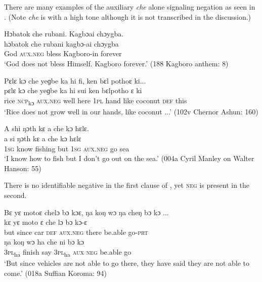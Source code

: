 There are many examples of the auxiliary \textit{che} alone signaling negation as seen in . (Note \textit{che} is with a high tone although it is not transcribed in the discussion.)

\ea%
    \label{ex:132}
    \ea Hɔbatok che rubani. Kagbɔai chɔygba.\\
    \gll hɔbatok  che      rubani    kagbɔ-ai      chɔygba\\
    God    \textsc{aux.neg}    bless      Kagboro-in    forever\\
    \glt ‘God does not bless Himself. Kagboro forever.' (188 Kagboro anthem: 8)

    \ex Pɛlɛ kɔ che yeɡbe ka hi fi, ken bɛl pothoɛ ki...\\
    \gll pɛlɛ  kɔ      che      yeɡbe    ka    hi    sui    ken  bɛlpotho ɛ     ki\\
    rice  \textsc{ncp}\textsubscript{kɔ}    \textsc{aux.neg}    well    here  \textsc{1pl}  hand  like  coconut  \textsc{def}  this\\
    \glt ‘Rice does not grow well in our hands, like coconut ...' (102v Chernor Ashun: 160)

    \newpage
    \ex A shi ŋɔth kɛ a che kɔ hɛlɛ.\\
    \gll a    si      ŋɔth    kɛ    a    che      kɔ    hɛlɛ\\
    \textsc{1sg}  know    fishing  but  \textsc{1sg}  \textsc{aux.neg}   go    sea\\
    \glt ‘I know how to fish but I don't go out on the sea.' (004a Cyril Manley on Walter Hanson: 55)
\z
\z

There is no identifiable negative in the first clause of , yet \textsc{neg} is present in the second.

\ea%
    \label{ex:133}
    Bɛ yɛ motoɛ chelɔ bɔ  kɔɛ, ŋa koŋ wɔ ŋa cheŋ bɔ kɔ ...\\
    \gll kɛ    yɛ    moto  ɛ    che      lɔ    bɔ      kɔ-ɛ\\
    but  since  car  \textsc{def}  \textsc{aux.neg}    there  be.able  go-\textsc{prt}\\
    \gll ŋa    koŋ    wɔ    ha    che  ni    bɔ      kɔ\\
    \textsc{3pl}\textsubscript{ha}  finish    say  \textsc{3pl}\textsubscript{ha}  \textsc{aux}  \textsc{neg}  be.able  go\\
    \glt ‘But since vehicles are not able to go there, they have said they are not able to come.' (018a Suffian Koroma: 94)
\z

